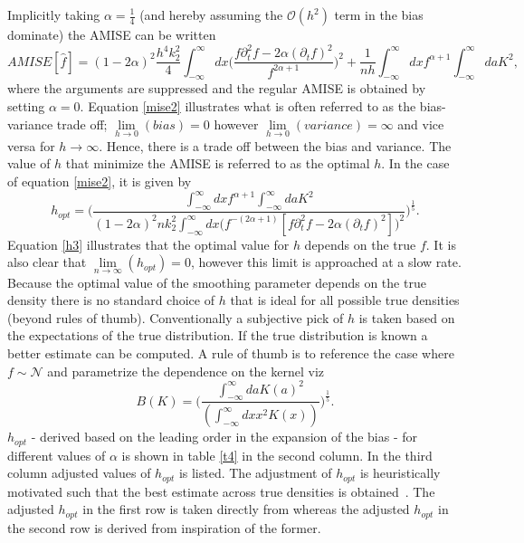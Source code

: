 \documentclass[
twoside,
openright,
titlepage,
numbers=noenddot,
headinclude,%
footinclude=true,
dottedtoc, %
ngerman,
american, %
pagesize=pdftex,
]{book}
\begin{document}
	Implicitly taking $\alpha=\frac{1}{4}$ (and hereby assuming the $\mathcal{O}(h^2)$ term in the bias dominate) the AMISE can be written
	\begin{equation}
		AMISE[\hat{f}]= (1-2\alpha)^2\frac{h^4k_2^2}{4}\int_{-\infty}^{\infty}dx\bigg(\frac{f\partial_t^2f-2\alpha(\partial_tf)^2}{f^{2\alpha+1}}\bigg)^2+\frac{1}{nh}\int_{-\infty}^{\infty}dxf^{\alpha+1}\int_{-\infty}^{\infty}da K^2,
		\label{mise2}
	\end{equation}
	where the arguments are suppressed and the regular AMISE is obtained by setting $\alpha=0$. Equation \eqref{mise2} illustrates what is often referred to as the bias-variance trade off; $\lim\limits_{h\rightarrow 0}(bias)=0$ however $\lim\limits_{h\rightarrow 0}(variance)=\infty$ and vice versa for $h\rightarrow \infty$. Hence, there is a trade off between the bias and variance. The value of $h$ that minimize the AMISE is referred to as the optimal $h$. In the case of equation \eqref{mise2}, it is given by
	\begin{equation}
		h_{opt}= \bigg(\frac{\int_{-\infty}^{\infty}dxf^{\alpha+1}\int_{-\infty}^{\infty}da K^2}{(1-2\alpha)^2nk_2^2\int_{-\infty}^{\infty}dx\big(f^{-(2\alpha+1)}[f\partial_t^2f-2\alpha(\partial_tf)^2]\big)^2}\bigg)^\frac{1}{5}.
		\label{h3}
	\end{equation}
	Equation \eqref{h3} illustrates that the optimal value for $h$ depends on the true $f$. It is also clear that $\lim\limits_{n\rightarrow \infty}(h_{opt})=0$, however this limit is approached at a slow rate. Because the optimal value of the smoothing parameter depends on the true density there is no standard choice of $h$ that is ideal for all possible true densities (beyond rules of thumb). Conventionally a subjective pick of $h$ is taken based on the expectations of the true distribution. If the true distribution is known a better estimate can be computed. A rule of thumb is to reference the case where $f\sim\mathcal{N}$ and parametrize the dependence on the kernel viz
	\begin{equation}
		B(K)=\bigg(\frac{\int_{-\infty}^{\infty}da K(a)^2}{(\int_{-\infty}^{\infty}dxx^2K(x))}\bigg)^\frac{1}{5}.
	\end{equation}
	$h_{opt}$ - derived based on the leading order in the expansion of the bias - for different values of $\alpha$ is shown in table \ref{t4} in the second column. In the third column adjusted values of $h_{opt}$ is listed. The adjustment of $h_{opt}$ is heuristically motivated such that the best estimate across true densities is obtained~\citep{Silverman86}. The adjusted $h_{opt}$ in the first row is taken directly from \citet{Silverman86} whereas the adjusted $h_{opt}$ in the second row is derived from inspiration of the former. 
\end{document}
